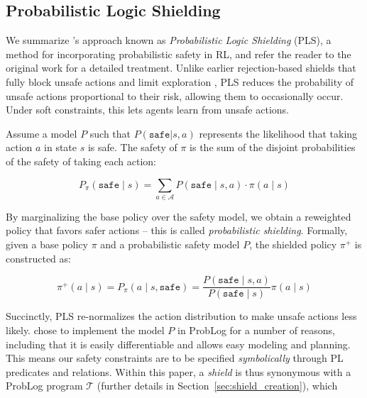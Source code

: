 \documentclass{ecai}
\theoremstyle{plain}
\theoremstyle{definition}
\theoremstyle{remark}
\begin{document}
\subsection{Probabilistic Logic Shielding}

We summarize \citet{yang2023safe}'s approach known as \textit{Probabilistic Logic Shielding} (PLS), a method for incorporating probabilistic safety in RL, and refer the reader to the original work for a detailed treatment. Unlike earlier rejection-based shields that fully block unsafe actions and limit exploration \citep{alshiekh2018safe}, PLS reduces the probability of unsafe actions proportional to their risk, allowing them to occasionally occur. Under soft constraints, this lets agents learn from unsafe actions.


Assume a model $P$ such that $P(\texttt{safe} | s,a)$ represents the likelihood that taking action $a$ in state $s$ is safe.
The safety of $\pi$ is the sum of the disjoint probabilities of the safety of taking each action:
\begin{small}
\begin{equation}
    P_\pi(\texttt{safe}\mid s)=\sum_{a\in\mathcal{A}}P(\texttt{safe}\mid s,a)\cdot\pi(a\mid s)
\end{equation}
\end{small}
By marginalizing the base policy over the safety model, we obtain a reweighted policy that favors safer actions -- this is called \textit{probabilistic shielding}. Formally, %
given a base policy $\pi$ and a probabilistic safety model $P$, the shielded policy $\pi^+$ is constructed as:
\begin{small}
\begin{equation} \label{eq:pshielding}
    \pi^+(a\mid s)=P_\pi(a\mid s,\mathtt{safe})=\frac{P(\mathtt{safe}\mid s,a)}{P(\mathtt {safe}\mid s)}\pi(a\mid s)
\end{equation}
\end{small}
Succinctly, PLS re-normalizes the action distribution to make unsafe actions less likely. \citet{yang2023safe} chose to implement the model $P$ in ProbLog \citep{de2007problog} for a number of reasons, including that it is easily differentiable and allows easy modeling and planning. This means our safety constraints are to be specified \textit{symbolically} through PL predicates and relations. Within this paper, a \textit{shield} is thus synonymous with a ProbLog program $\mathcal{T}$ (further details in Section~\ref{sec:shield_creation}), which
\end{document}
